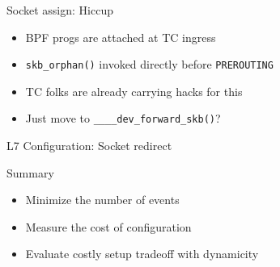 \documentclass[black,white]{beamer}
\DeclareRobustCommand{\#}{\adjustbox{valign=B,totalheight=.57\baselineskip}{\oldhash}}%
\begin{document}
    \begin{frame}[fragile]{Socket assign: Hiccup}
        \centering
        \begin{itemize}
            \item BPF progs are attached at TC ingress \medskip
            \item \verb+skb_orphan()+ invoked directly before \verb+PREROUTING+ \medskip
            \pause
            \item TC folks are already carrying hacks for this\footnotemark \medskip
            \pause
            \item Just move to \verb+____dev_forward_skb()+\footnotemark? \medskip
        \end{itemize}
    \end{frame}

    \begin{frame}{L7 Configuration: Socket redirect}
        
    \end{frame}

    \begin{frame}{Summary}
        \begin{itemize}
            \item Minimize the number of events \medskip
            \item Measure the cost of configuration \medskip
            \item Evaluate costly setup tradeoff with dynamicity \medskip
        \end{itemize}
    \end{frame}
\end{document}
